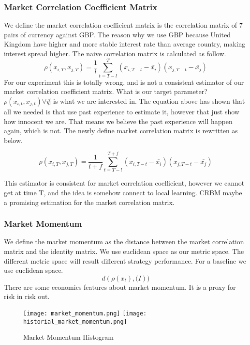 {\subsubsection{Market Correlation Coefficient Matrix}
    We define the market correlation coefficient matrix is the correlation matrix of 7 pairs of currency against GBP. The reason why we use GBP because United Kingdom have higher and more stable interest rate than average country, making interest spread higher. The naive  correlation matrix is calculated as follow.
    $$\rho (x_{i,T},x_{j,T}) = \frac{1}{l}\sum^{T}_{t=T-l}(x_{i,T-t} - \bar{x_{i}})(x_{j,T-t}-\bar{x_{j}})$$
    For our experiment this is totally wrong, and is not a consistent estimator of our market correlation coefficient matrix. What is our target parameter? $\rho(x_{i,t},x_{j,t}) \forall i \not j$ is what we are interested in. The equation above has shown that all we needed is that use past experience to estimate it, however that just show how innocent we are. That means we believe the past experience will happen again, which is not. The newly define market correlation matrix is rewritten as below.
    
    $$\rho (x_{i,T},x_{j,T}) = \frac{1}{l+f}\sum^{T+f}_{t=T-l}(x_{i,T-t} - \bar{x_{i}})(x_{j,T-t}-\bar{x_{j}})$$
    
    This estimator is consistent for market correlation coefficient, however we cannot get at time T, and the idea is somehow connect to local learning. CRBM maybe a promising estimation for the market correlation matrix.
    
\subsubsection{Market Momentum}

We define the market momentum as the distance between the market correlation matrix and the identity matrix. We use euclidean space as our metric space. The different metric space will result different strategy performance. For a baseline we use euclidean space.
    $$d(\rho(x_{t}), \mathbf(I))$$
    There are some economics features about market momentum. It is a proxy for risk in risk out.
    
\begin{figure}
\caption{Market Momentum Histogram}
\centering
\texttt{[image: market\_momentum.png]}
\texttt{[image: historial\_market\_momentum.png]}
\label{fig:my_label}
\end{figure}


}
